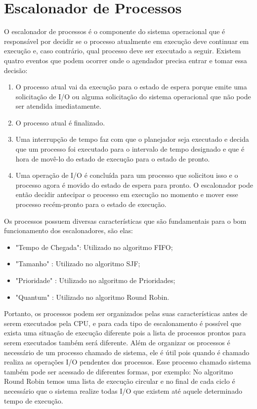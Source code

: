 \documentclass[times, 10pt,twocolumn]{article}
\begin{document}
    

\section{Escalonador de Processos} \label{sec_escalonador_proc}
O escalonador de processos é o componente do sistema operacional que é responsável por decidir se o processo atualmente em execução deve continuar em execução e, caso contrário, qual processo deve ser executado a seguir.\cite{rutgers} Existem quatro eventos que podem ocorrer onde o agendador precisa entrar e tomar essa decisão: 
\begin{enumerate}
\item O processo atual vai da execução para o estado de espera porque emite uma solicitação de I/O ou alguma solicitação do sistema operacional que não pode ser atendida imediatamente. 

\item O processo atual é finalizado.
\item Uma interrupção de tempo faz com que o planejador seja executado e decida que um processo foi executado para o intervalo de tempo designado e que é hora de movê-lo do estado de execução para o estado de pronto.
 
\item Uma operação de I/O é concluída para um processo que solicitou isso e o processo agora é movido do estado de espera para pronto. O escalonador pode então decidir antecipar o processo em execução no momento e mover esse processo recém-pronto para o estado de execução.  
\end{enumerate}
Os processos possuem diversas características que são fundamentais para o bom funcionamento dos escalonadores, são elas:  
\begin{itemize} 
\item "Tempo de Chegada": Utilizado no algoritmo FIFO;	
\item "Tamanho" : Utilizado no algoritmo SJF; 
\item "Prioridade" : Utilizado no algoritmo de Prioridades;  
\item "Quantum" : Utilizado no algoritmo Round Robin.
\end{itemize}
Portanto, os processos podem ser organizados pelas suas características antes de serem executados pela CPU, e para cada tipo de escalonamento é possível que exista uma situação de execução diferente pois a lista de processos prontos para serem executados também será diferente. Além de organizar os processos é necessário de um processo chamado de sistema, ele é útil pois quando é chamado realiza as operações I/O pendentes dos processos. Esse processo chamado sistema também pode ser acessado de diferentes formas, por exemplo: No algoritmo Round Robin temos uma lista de execução circular e no final de cada ciclo é necessário que o sistema realize todas I/O que existem até aquele determinado tempo de execução. \cite{tutorialspoint}
\end{document}
